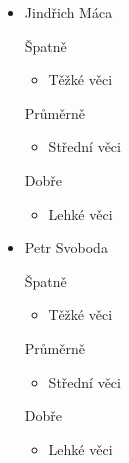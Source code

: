 \documentclass{beamer}
\begin{document}
\begin{frame}[allowframebreaks]
\begin{itemize}
    \item Jindřich Máca
      \begin{block}{Špatně} %
       \begin{itemize}
        \item Těžké věci
       \end{itemize}
     \end{block}
     \begin{block}{Průměrně} %
        \begin{itemize}
        \item Střední věci
       \end{itemize}
     \end{block}
     \begin{block}{Dobře} %
       \begin{itemize}
        \item Lehké věci
       \end{itemize}
     \end{block}
   
    \item Petr Svoboda
      \begin{block}{Špatně} %
       \begin{itemize}
        \item Těžké věci
       \end{itemize}
     \end{block}
     \begin{block}{Průměrně} %
        \begin{itemize}
        \item Střední věci
       \end{itemize}
     \end{block}
     \begin{block}{Dobře} %
       \begin{itemize}
        \item Lehké věci
       \end{itemize}
     \end{block}
   \end{itemize}
\end{frame}

\end{document}
